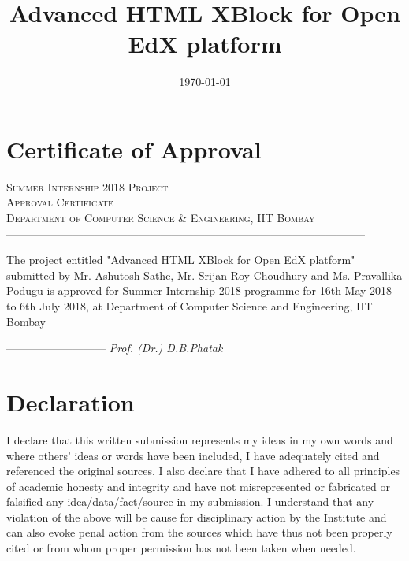 \documentclass[a4paper, twosided, openany]{memoir}
\begin{document}
\pagestyle{plain}
\title{Advanced HTML XBlock for Open EdX platform}
\date{\today}

\frontmatter


\chapter*{Certificate of Approval}

\begin{center}
\textsc{\LARGE Summer Internship 2018 Project}\\
\bigskip
\textsc{\Large Approval Certificate}\\
\bigskip
\textsc{ Department of Computer Science \& Engineering, IIT Bombay}\\
\textsc{--------------------------------------------------------------------------------------------------}\\
\bigskip\bigskip\bigskip\bigskip\bigskip\bigskip

The project entitled "Advanced HTML XBlock for Open EdX platform" submitted by Mr. Ashutosh Sathe, Mr. Srijan Roy Choudhury and Ms. Pravallika Podugu is approved for Summer Internship 2018 programme for 16th May 2018 to 6th July 2018, at Department of Computer Science and Engineering, IIT Bombay
\end{center}
\vspace*{\fill}
\begin{center}
	\begin{flushleft}
		\bigskip
		\textsc{---------------------------}\newline
		\bigskip
		\emph{Prof. (Dr.) D.B.Phatak}
	\end{flushleft}
\end{center}
\chapter*{Declaration}
\begin{center}
I declare that this written submission represents my ideas in my own words and where
others’ ideas or words have been included, I have adequately cited and referenced the
original sources. I also declare that I have adhered to all principles of academic
honesty and integrity and have not misrepresented or fabricated or falsified any
idea/data/fact/source in my submission. I understand that any violation of the above
will be cause for disciplinary action by the Institute and can also evoke penal action
from the sources which have thus not been properly cited or from whom proper
permission has not been taken when needed.




\end{center}
\end{document}
